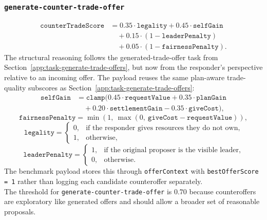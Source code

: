 \documentclass{article}
\begin{document}
\subsubsection{\texttt{generate-counter-trade-offer}}
\label{app:task-generate-counter-trade-offer}
\[
\begin{aligned}
\texttt{counterTradeScore}
&= 0.35 \cdot \texttt{legality}
+ 0.45 \cdot \texttt{selfGain} \\
&\quad + 0.15 \cdot (1 - \texttt{leaderPenalty}) \\
&\quad
+ 0.05 \cdot (1 - \texttt{fairnessPenalty}).
\end{aligned}
\]
The structural reasoning follows the generated-trade-offer task from Section~\ref{app:task-generate-trade-offers}, but now from the responder's perspective relative to an incoming offer.
The payload reuses the same plan-aware trade-quality subscores as Section~\ref{app:task-generate-trade-offers}:
\[
\begin{aligned}
\texttt{selfGain}
&= \texttt{clamp}(0.45 \cdot \texttt{requestValue}
+ 0.35 \cdot \texttt{planGain} \\
&\quad + 0.20 \cdot \texttt{settlementGain}
- 0.35 \cdot \texttt{giveCost}),
\end{aligned}
\]
\[
\texttt{fairnessPenalty}
= \min(1,\ \max(0,\ \texttt{giveCost} - \texttt{requestValue})),
\]
\[
\texttt{legality} =
\begin{cases}
0, & \text{if the responder gives resources they do not own},\\
1, & \text{otherwise},
\end{cases}
\]
\[
\texttt{leaderPenalty} =
\begin{cases}
1, & \text{if the original proposer is the visible leader},\\
0, & \text{otherwise}.
\end{cases}
\]
The benchmark payload stores this through \texttt{offerContext} with \texttt{bestOfferScore = 1} rather than logging each candidate counteroffer separately.
\\
The threshold for \texttt{generate-counter-trade-offer} is $0.70$ because counteroffers are exploratory like generated offers and should allow a broader set of reasonable proposals.
\end{document}
